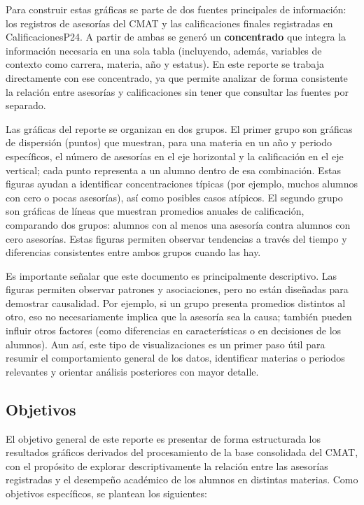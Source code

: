 \documentclass[12pt]{article}
\begin{document}
Para construir estas gráficas se parte de dos fuentes principales de información: los registros de asesorías del CMAT y las calificaciones finales registradas en CalificacionesP24. A partir de ambas se generó un \textbf{concentrado} que integra la información necesaria en una sola tabla (incluyendo, además, variables de contexto como carrera, materia, año y estatus). En este reporte se trabaja directamente con ese concentrado, ya que permite analizar de forma consistente la relación entre asesorías y calificaciones sin tener que consultar las fuentes por separado.

Las gráficas del reporte se organizan en dos grupos. El primer grupo son gráficas de dispersión (puntos) que muestran, para una materia en un año y periodo específicos, el número de asesorías en el eje horizontal y la calificación en el eje vertical; cada punto representa a un alumno dentro de esa combinación. Estas figuras ayudan a identificar concentraciones típicas (por ejemplo, muchos alumnos con cero o pocas asesorías), así como posibles casos atípicos. El segundo grupo son gráficas de líneas que muestran promedios anuales de calificación, comparando dos grupos: alumnos con al menos una asesoría contra alumnos con cero asesorías. Estas figuras permiten observar tendencias a través del tiempo y diferencias consistentes entre ambos grupos cuando las hay.

Es importante señalar que este documento es principalmente descriptivo. Las figuras permiten observar patrones y asociaciones, pero no están diseñadas para demostrar causalidad. Por ejemplo, si un grupo presenta promedios distintos al otro, eso no necesariamente implica que la asesoría sea la causa; también pueden influir otros factores (como diferencias en características o en decisiones de los alumnos). Aun así, este tipo de visualizaciones es un primer paso útil para resumir el comportamiento general de los datos, identificar materias o periodos relevantes y orientar análisis posteriores con mayor detalle.

\subsection{Objetivos}

El objetivo general de este reporte es presentar de forma estructurada los resultados gráficos derivados del procesamiento de la base consolidada del CMAT, con el propósito de explorar descriptivamente la relación entre las asesorías registradas y el desempeño académico de los alumnos en distintas materias. Como objetivos específicos, se plantean los siguientes:
\end{document}
